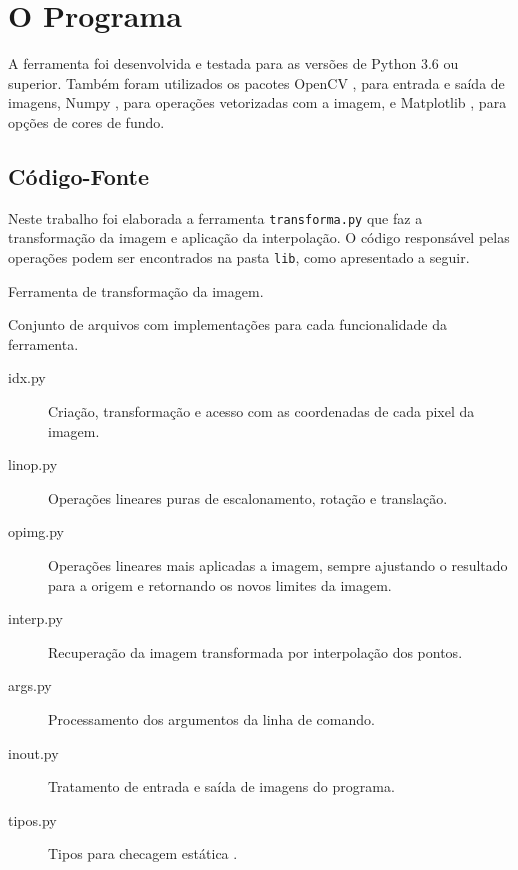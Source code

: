 \section{O Programa} \label{sec:programa}


A ferramenta foi desenvolvida e testada para as versões de Python \autocite{python} 3.6 ou superior. Também foram utilizados os pacotes OpenCV \autocite{opencv}, para entrada e saída de imagens, Numpy \autocite{numpy}, para operações vetorizadas com a imagem, e Matplotlib \autocite{matplotlib}, para opções de cores de fundo.

\subsection{Código-Fonte}

    Neste trabalho foi elaborada a ferramenta \texttt{transforma.py} que faz a transformação da imagem e aplicação da interpolação. O código responsável pelas operações podem ser encontrados na pasta \texttt{lib}, como apresentado a seguir.

    \begin{description}[leftmargin=1.5em]

        \item[transforma.py] Ferramenta de transformação da imagem.

        \item[lib] Conjunto de arquivos com implementações para cada funcionalidade da ferramenta.

        \begin{description}

            \item[idx.py] Criação, transformação e acesso com as coordenadas de cada pixel da imagem.

            \item[linop.py] Operações lineares puras de escalonamento, rotação e translação.

            \item[opimg.py] Operações lineares mais aplicadas a imagem, sempre ajustando o resultado para a origem e retornando os novos limites da imagem.

            \item[interp.py] Recuperação da imagem transformada por interpolação dos pontos.

            \item[args.py] Processamento dos argumentos da linha de comando.

            \item[inout.py] Tratamento de entrada e saída de imagens do programa.

            \item[tipos.py] Tipos para checagem estática \autocite{mypy} \autocite{pep484}.
        \end{description}
    \end{description}

